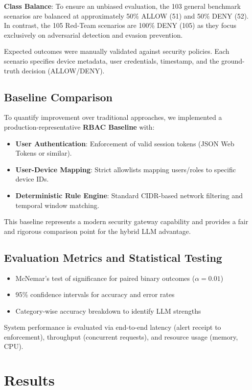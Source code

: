 \documentclass[conference]{IEEEtran}
\begin{document}
\textbf{Class Balance}: To ensure an unbiased evaluation, the 103 general benchmark scenarios are balanced at approximately 50\% ALLOW (51) and 50\% DENY (52). In contrast, the 105 Red-Team scenarios are 100\% DENY (105) as they focus exclusively on adversarial detection and evasion prevention.

Expected outcomes were manually validated against security policies. Each scenario specifies device metadata, user credentials, timestamp, and the ground-truth decision (ALLOW/DENY).

\subsection{Baseline Comparison}

To quantify improvement over traditional approaches, we implemented a production-representative \textbf{RBAC Baseline} with:
\begin{itemize}
    \item \textbf{User Authentication}: Enforcement of valid session tokens (JSON Web Tokens or similar).
    \item \textbf{User-Device Mapping}: Strict allowlists mapping users/roles to specific device IDs.
    \item \textbf{Deterministic Rule Engine}: Standard CIDR-based network filtering and temporal window matching.
\end{itemize}
This baseline represents a modern security gateway capability and provides a fair and rigorous comparison point for the hybrid LLM advantage.

\subsection{Evaluation Metrics and Statistical Testing}

\begin{itemize}
    \item McNemar's test of significance for paired binary outcomes ($\alpha=0.01$)
    \item 95\% confidence intervals for accuracy and error rates
    \item Category-wise accuracy breakdown to identify LLM strengths
\end{itemize}

System performance is evaluated via end-to-end latency (alert receipt to enforcement), throughput (concurrent requests), and resource usage (memory, CPU).

\section{Results}
\end{document}
